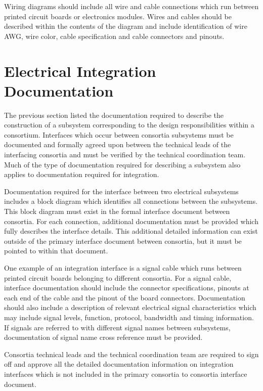 Wiring diagrams should include all wire and cable connections which
run between printed circuit boards or electronics modules.  Wires and
cables should be described within the contents of the diagram and
include identification of wire AWG, wire color, cable specification
and cable connectors and pinouts.


\section{Electrical Integration Documentation}
\label{sec:fdsp-coord-integ-electrical}
The previous section listed the documentation required to describe the
construction of a subsystem corresponding to the design
responsibilities within a consortium.  Interfaces which occur between
consortia subsystems must be documented and formally agreed upon
between the technical leads of the interfacing consortia and must be
verified by the technical coordination team.  Much of the type of
documentation required for describing a subsystem also applies to
documentation required for integration.

Documentation required for the interface between two electrical
subsystems includes a block diagram which identifies all connections
between the subsystems.  This block diagram must exist in the formal
interface document between consortia.  For each connection, additional
documentation must be provided which fully describes the interface
details. This additional detailed information can exist outside of the
primary interface document between consortia, but it must be pointed
to within that document.

One example of an integration interface is a signal cable which runs
between printed circuit boards belonging to different consortia.  For
a signal cable, interface documentation should include the connector
specifications, pinouts at each end of the cable and the pinout of the
board connectors.  Documentation should also include a description of
relevant electrical signal characteristics which may include signal
levels, function, protocol, bandwidth and timing information.  If
signals are referred to with different signal names between
subsystems, documentation of signal name cross reference must be
provided.

Consortia technical leads and the technical coordination team are
required to sign off and approve all the detailed documentation
information on integration interfaces which is not included in the
primary consortia to consortia interface document.
 


